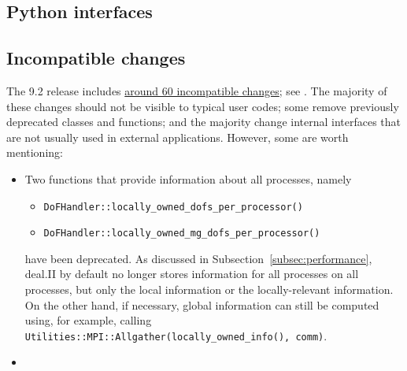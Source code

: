\documentclass{ansarticle-preprint}
\begin{document}

\subsection{Python interfaces}
\label{subsec:python}





\subsection{Incompatible changes}

The 9.2 release includes
\href{https://dealii.org/developer/doxygen/deal.II/changes_between_9_1_1_and_9_2_0.html}
     {around 60 incompatible changes}; see \cite{changes92}. The majority of these changes
should not be visible to typical user codes; some remove previously
deprecated classes and functions; and the majority change internal
interfaces that are not usually used in external
applications. However, some are worth mentioning:
\begin{itemize}
\item Two functions that provide information about all processes,
  namely
  \begin{itemize}
 \item \texttt{DoFHandler::locally\_owned\_dofs\_per\_processor()}
 \item \texttt{DoFHandler::locally\_owned\_mg\_dofs\_per\_processor()}
  \end{itemize}
have been deprecated. As discussed in
Subsection~\ref{subsec:performance}, deal.II by default no longer
stores information for all processes on all processes, but only the
local information or the locally-relevant information. On the other
hand, if necessary, global information can still be computed using,
for example, calling \texttt{Utilities::MPI::Allgather(locally\_owned\_info(), comm)}.
\item
\end{itemize}



\end{document}

